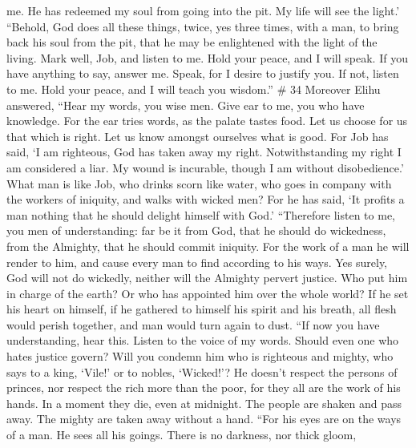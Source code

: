 me.  He has redeemed my soul from going into the pit. My
life will see the light.'  ``Behold, God does all these
things, twice, yes three times, with a man,  to bring
back his soul from the pit, that he may be enlightened with the light of
the living.  Mark well, Job, and listen to me. Hold your
peace, and I will speak.  If you have anything to say,
answer me. Speak, for I desire to justify you.  If not,
listen to me. Hold your peace, and I will teach you wisdom.'' \# 34
 Moreover Elihu answered,  ``Hear my words,
you wise men. Give ear to me, you who have knowledge.  For
the ear tries words, as the palate tastes food.  Let us
choose for us that which is right. Let us know amongst ourselves what is
good.  For Job has said, `I am righteous, God has taken
away my right.  Notwithstanding my right I am considered a
liar. My wound is incurable, though I am without disobedience.'
 What man is like Job, who drinks scorn like water,
 who goes in company with the workers of iniquity, and
walks with wicked men?  For he has said, `It profits a man
nothing that he should delight himself with God.' 
``Therefore listen to me, you men of understanding: far be it from God,
that he should do wickedness, from the Almighty, that he should commit
iniquity.  For the work of a man he will render to him,
and cause every man to find according to his ways.  Yes
surely, God will not do wickedly, neither will the Almighty pervert
justice.  Who put him in charge of the earth? Or who has
appointed him over the whole world?  If he set his heart
on himself, if he gathered to himself his spirit and his breath,
 all flesh would perish together, and man would turn
again to dust.  ``If now you have understanding, hear
this. Listen to the voice of my words.  Should even one
who hates justice govern? Will you condemn him who is righteous and
mighty,  who says to a king, `Vile!' or to nobles,
`Wicked!'?  He doesn't respect the persons of princes,
nor respect the rich more than the poor, for they all are the work of
his hands.  In a moment they die, even at midnight. The
people are shaken and pass away. The mighty are taken away without a
hand.  ``For his eyes are on the ways of a man. He sees
all his goings.  There is no darkness, nor thick gloom,
